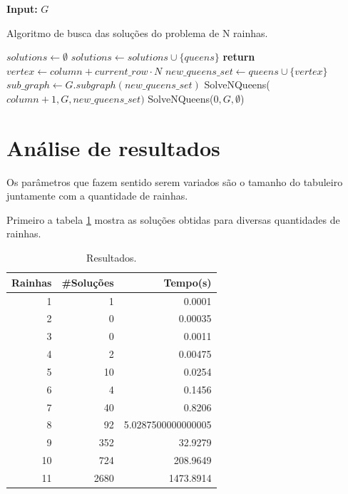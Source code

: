 \documentclass[11pt]{article}
\begin{document}
\begin{algorithm}
\textbf{Input:} $G$
\caption{Algoritmo de busca das soluções do problema de N rainhas.}\label{alg:solvenqueens}
\begin{algorithmic}[1]
\State $solutions \gets \emptyset$
\State $solutions\gets solutions \cup \{queens\}$
\State \textbf{return}
\EndIf
{}
\State $vertex \gets column+current\_row\cdot N$
\State $new\_queens\_set \gets queens \cup \{vertex\}$
\State $sub\_graph \gets G.subgraph(new\_queens\_set)$
\State SolveNQueens($column+1,G,new\_queens\_set)$
\EndIf
\EndFor
\EndProcedure
SolveNQueens($0,G,\emptyset$)
\end{algorithmic}
\end{algorithm}


\section{Análise de resultados}
\label{sec:orgfa1feab}

Os parâmetros que fazem sentido serem variados são o tamanho do tabuleiro juntamente com a quantidade de rainhas.

Primeiro a tabela \ref{tab:data} mostra as soluções obtidas para diversas quantidades de rainhas.

\begin{table}[htbp]
\centering
\begin{tabular}{rrr}
Rainhas & \#Soluções & Tempo(s)\\
\hline
1 & 1 & 0.0001\\
2 & 0 & 0.00035\\
3 & 0 & 0.0011\\
4 & 2 & 0.00475\\
5 & 10 & 0.0254\\
6 & 4 & 0.1456\\
7 & 40 & 0.8206\\
8 & 92 & 5.0287500000000005\\
9 & 352 & 32.9279\\
10 & 724 & 208.9649\\
11 & 2680 & 1473.8914\\
\hline
\end{tabular}
\caption{Resultados.\label{tab:data}}

\end{table}
\end{document}
